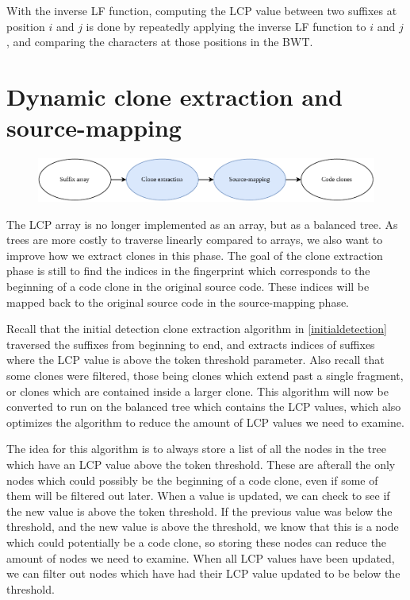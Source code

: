 With the inverse LF function, computing the LCP value between two suffixes at position $i$
and $j$ is done by repeatedly applying the inverse LF function to $i$ and $j$, and
comparing the characters at those positions in the BWT.




\section{Dynamic clone extraction and source-mapping}

\begin{figure}[H]
    \begin{center}
        \includegraphics[width=1\textwidth]{figures/phases/phases_extractionandsourcemap.drawio.pdf}
    \end{center}
\end{figure}

The LCP array is no longer implemented as an array, but as a balanced tree. As trees are
more costly to traverse linearly compared to arrays, we also want to improve how we
extract clones in this phase. The goal of the clone extraction phase is still to find the
indices in the fingerprint which corresponds to the beginning of a code clone in the
original source code. These indices will be mapped back to the original source code in the
source-mapping phase.

Recall that the initial detection clone extraction algorithm in \cref{initialdetection}
traversed the suffixes from beginning to end, and extracts indices of suffixes where the
LCP value is above the token threshold parameter. Also recall that some clones were
filtered, those being clones which extend past a single fragment, or clones which are
contained inside a larger clone. This algorithm will now be converted to run on the
balanced tree which contains the LCP values, which also optimizes the algorithm to reduce
the amount of LCP values we need to examine.

The idea for this algorithm is to always store a list of all the nodes in the tree which
have an LCP value above the token threshold. These are afterall the only nodes which could
possibly be the beginning of a code clone, even if some of them will be filtered out
later. When a value is updated, we can check to see if the new value is above the token
threshold. If the previous value was below the threshold, and the new value is above the
threshold, we know that this is a node which could potentially be a code clone, so storing
these nodes can reduce the amount of nodes we need to examine. When all LCP values have
been updated, we can filter out nodes which have had their LCP value updated to be below
the threshold.

